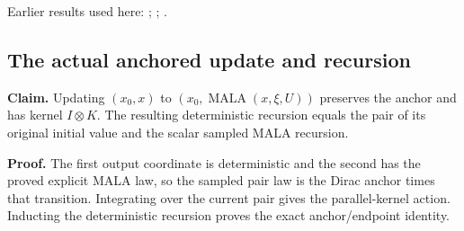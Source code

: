 \documentclass[11pt,a4paper]{report}
\begin{document}
Earlier results used here: \cite[Section~3.33.5]{LangevinLean2026ULASC}; \cite[Section~3.36.12]{LangevinLean2026ULASC}; \cite[Section~3.36.9]{LangevinLean2026ULASC}.
\subsection{\texorpdfstring{The actual anchored update and recursion}{The actual anchored update and recursion}}
\label{report-step-WassersteinMixing-SemigroupRandomMALAAnchors-lean-2}


\textbf{Claim.} Updating \((x_0,x)\) to \((x_0,\operatorname{MALA}(x,\xi,U))\) preserves the anchor and has kernel \(I\otimes K\). The resulting deterministic recursion equals the pair of its original initial value and the scalar sampled MALA recursion.



\textbf{Proof.} The first output coordinate is deterministic and the second has the proved explicit MALA law, so the sampled pair law is the Dirac anchor times that transition. Integrating over the current pair gives the parallel-kernel action. Inducting the deterministic recursion proves the exact anchor/\allowbreak{}endpoint identity.
\end{document}
